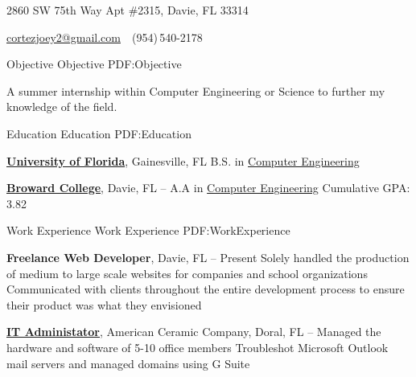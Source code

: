 \documentclass[letterpaper,MMMyyyy,nonstopmode]{resume}
\newcommand{\CVAuthor}{Joseph Cortez}
\newcommand{\CVWebpage}{http://www.josephcortez.me/}
\begin{document}

\Title{\CVAuthor}

\begin{SubTitle}
{2860 SW 75th Way Apt \#2315, Davie, FL 33314}
\par
\href{mailto:cortezjoey2@gmail.com}
{cortezjoey2@gmail.com}
\,\SubBulletSymbol\,
(954)\,540-2178\,
\end{SubTitle}

\begin{Body}


\Section
{Objective}
{Objective}
{PDF:Objective}

\Entry
A summer internship within Computer Engineering or Science to further my knowledge of the field.


\Section
{Education}
{Education}
{PDF:Education}

\Entry
\href{http://www.ufl.edu}
{\textbf{University of Florida}},
Gainesville, FL
\hfill
{}
\Gap
\BulletItem
B.S. in
\href{http://www.cpe.eng.ufl.edu}
{Computer Engineering}

\BigGap
\Entry
\href{http://www.broward.edu}
{\textbf{Broward College}},
Davie, FL
\hfill
{} --
\Gap
\BulletItem
A.A in
\href{http://www.broward.edu/academics/programs/computer/capture/Pages/what-is-computer-science-and-engineering-.aspx}
{Computer Engineering}
\BulletItem
Cumulative GPA: 3.82


\Section
{Work\newline
Experience}
{Work Experience}
{PDF:WorkExperience}

\Entry
{\textbf{Freelance Web Developer}},
Davie, FL
\hfill
{} --
Present
\Gap
\BulletItem
Solely handled the production of medium to large scale websites for companies and school organizations
\BulletItem
Communicated with clients throughout the entire development process to ensure their product was what they envisioned

\BigGap
\Entry
\href{http://www.celimausa.com/usincel.com/About_Us.html}
{\textbf{IT Administator}}, 
American Ceramic Company,
Doral, FL
\hfill
{} --
\Gap
\BulletItem
Managed the hardware and software of 5-10 office members
\BulletItem
Troubleshot Microsoft Outlook mail servers and managed domains using G Suite


\end{Body}
\end{document}
